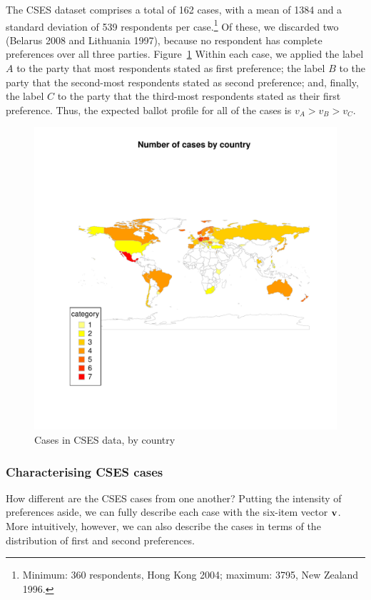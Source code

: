 \documentclass[11pt, letter]{article}
\begin{document}
The CSES dataset comprises a total of 162 cases, with a mean of 1384 and a standard deviation of 539 respondents per case.\footnote{Minimum: 360 respondents, Hong Kong 2004; maximum: 3795, New Zealand 1996.} Of these, we discarded two (Belarus 2008 and Lithuania 1997), because no respondent has complete preferences over all three parties. Figure~\ref{fig:case_map} Within each case, we applied the label $A$ to the party that most respondents stated as first preference; the label $B$ to the party that the second-most respondents stated as second preference; and, finally, the label $C$ to the party that the third-most respondents stated as their first preference. Thus, the expected ballot profile for all of the cases is $v_A > v_B > v_C$. 

\begin{figure}[!htb]
	\centering
	\includegraphics[width = .8 \textwidth]{../output/figures/case_map.pdf}
	\caption{Cases in CSES data, by country}
	\label{fig:case_map}
\end{figure}

\subsubsection{Characterising CSES cases}

How different are the CSES cases from one another? Putting the intensity of preferences aside, we can fully describe each case with the six-item vector $\bf v$. More intuitively, however, we can also describe the cases in terms of the distribution of first and second preferences.
\end{document}
